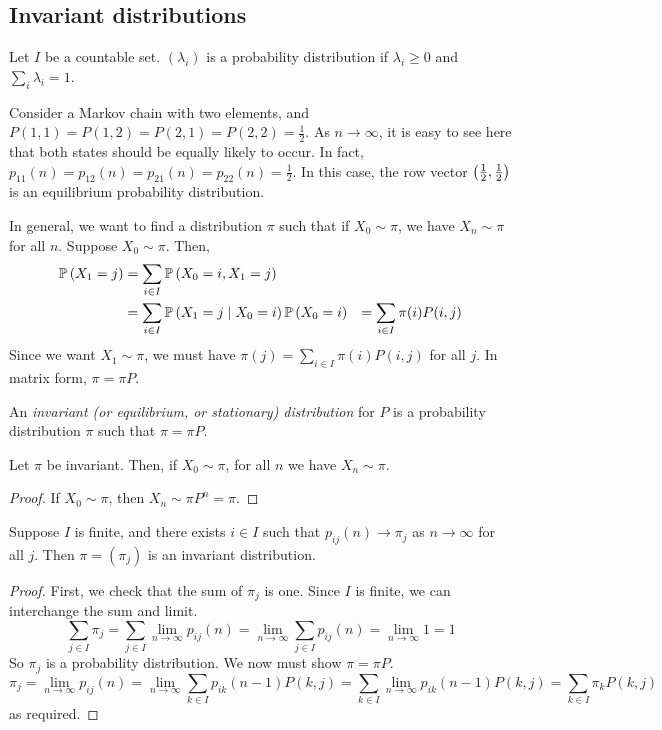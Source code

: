 \subsection{Invariant distributions}
Let \( I \) be a countable set. \( (\lambda_i) \) is a probability distribution if \( \lambda_i \geq 0 \) and \( \sum_i \lambda_i = 1 \).
\begin{example}
	Consider a Markov chain with two elements, and \( P(1,1) = P(1,2) = P(2,1) = P(2,2) = \frac{1}{2} \).
	As \( n \to \infty \), it is easy to see here that both states should be equally likely to occur.
	In fact, \( p_{11}(n) = p_{12}(n) = p_{21}(n) = p_{22}(n) = \frac{1}{2} \).
	In this case, the row vector \( \qty(\frac{1}{2}, \frac{1}{2}) \) is an equilibrium probability distribution.
\end{example}
In general, we want to find a distribution \( \pi \) such that if \( X_0 \sim \pi \), we have \( X_n \sim \pi \) for all \( n \).
Suppose \( X_0 \sim \pi \).
Then,
\begin{align*}
	\mathbb{P}\left({X_1 = j}\right) &= \sum_{i \in I} \mathbb{P}\left({X_0 = i, X_1 = j}\right) \\
	&= \sum_{i \in I} \mathbb{P}\left({X_1 = j \mid X_0 = i}\right)\mathbb{P}\left({X_0 = i}\right)
	&= \sum_{i \in I} \pi(i) P(i,j)
\end{align*}
Since we want \( X_1 \sim \pi \), we must have \( \pi(j) = \sum_{i \in I} \pi(i) P(i,j) \) for all \( j \).
In matrix form, \( \pi = \pi P \).
\begin{definition}
	An \textit{invariant (or equilibrium, or stationary) distribution} for \( P \) is a probability distribution \( \pi \) such that \( \pi = \pi P \).
\end{definition}
\begin{theorem}
	Let \( \pi \) be invariant.
	Then, if \( X_0 \sim \pi \), for all \( n \) we have \( X_n \sim \pi \).
\end{theorem}
\begin{proof}
	If \( X_0 \sim \pi \), then \( X_n \sim \pi P^n = \pi \).
\end{proof}
\begin{theorem}
	Suppose \( I \) is finite, and there exists \( i \in I \) such that \( p_{ij}(n) \to \pi_j \) as \( n \to \infty \) for all \( j \).
	Then \( \pi = (\pi_j) \) is an invariant distribution.
\end{theorem}
\begin{proof}
	First, we check that the sum of \( \pi_j \) is one.
	Since \( I \) is finite, we can interchange the sum and limit.
	\[ \sum_{j \in I} \pi_j = \sum_{j \in I} \lim_{n \to \infty} p_{ij}(n) = \lim_{n \to \infty} \sum_{j \in I} p_{ij}(n) = \lim_{n \to \infty} 1 = 1 \]
	So \( \pi_j \) is a probability distribution.
	We now must show \( \pi = \pi P \).
	\[ \pi_j = \lim_{n \to \infty} p_{ij}(n) = \lim_{n \to \infty} \sum_{k \in I} p_{ik}(n-1) P(k,j) = \sum_{k \in I} \lim_{n \to \infty} p_{ik}(n-1) P(k,j) = \sum_{k \in I} \pi_k P(k,j) \]
	as required.
\end{proof}
